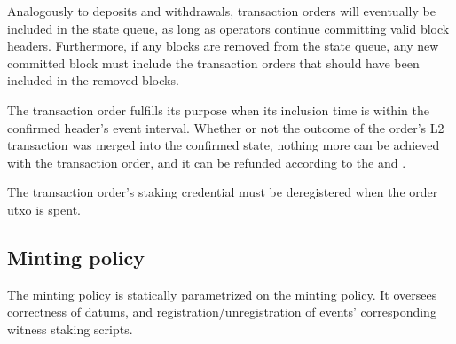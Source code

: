 \documentclass[../midgard.tex]{subfiles}
\begin{document}

Analogously to deposits and withdrawals, transaction orders will eventually be included in the state queue, as long as operators continue committing valid block headers.
Furthermore, if any blocks are removed from the state queue, any new committed block must include the transaction orders that should have been included in the removed blocks.

The transaction order fulfills its purpose when its inclusion time is within the confirmed header's event interval.
Whether or not the outcome of the order's L2 transaction was merged into the confirmed state, nothing more can be achieved with the transaction order, and it can be refunded according to the  and .

The transaction order's  staking credential must be deregistered when the order utxo is spent.

\subsection{Minting policy}
\label{h:transaction-order-minting-policy}

The  minting policy is statically parametrized on the  minting policy.
It oversees correctness of datums, and registration/unregistration of events' corresponding witness staking scripts.
\end{document}
